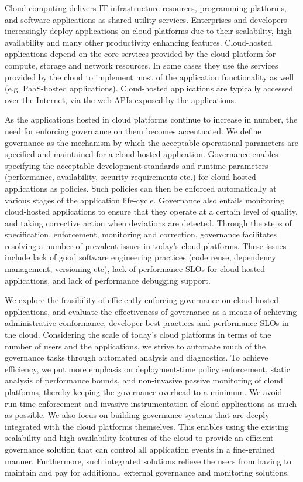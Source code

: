 Cloud computing delivers IT infrastructure resources, programming platforms, and software
applications as shared utility services. Enterprises and developers increasingly deploy applications 
on cloud platforms due to their scalability, high availability and many other
productivity enhancing features. Cloud-hosted applications depend on the core services provided
by the cloud platform for compute, storage and network resources. 
In some cases they use the services provided by the cloud to implement most of
the application functionality as well (e.g. PaaS-hosted applications). 
Cloud-hosted applications are typically
accessed over the Internet, via the web APIs exposed by the applications.

As the applications hosted in cloud platforms continue to increase in number, the need for enforcing
governance on them becomes accentuated. We define governance as the mechanism by which the 
acceptable operational parameters are specified and maintained for a cloud-hosted application.
Governance enables specifying the acceptable
development standards and runtime parameters (performance, availability, security requirements etc.) 
for cloud-hosted applications as policies. Such
policies can then be enforced automatically at various stages of the application life-cycle. 
Governance also entails
monitoring cloud-hosted applications to ensure that they operate at a certain level of quality,
and taking corrective action when deviations are detected. Through the steps of specification,
enforcement, monitoring and correction, governance facilitates resolving a number of prevalent issues in
today's cloud platforms. These issues include lack of good software engineering practices (code reuse,
dependency management, versioning etc), lack of performance SLOs for cloud-hosted applications,
and lack of performance debugging support. 

We explore the feasibility of efficiently enforcing governance on cloud-hosted
applications, and evaluate the effectiveness of governance as a means of achieving administrative
conformance, developer best practices and performance SLOs in the cloud. Considering the scale of
today's cloud platforms in terms of the number of users and the applications, 
we strive to automate much of the governance tasks through
automated analysis and diagnostics. To achieve efficiency, we put more emphasis on deployment-time
policy enforcement, static analysis of performance bounds, and non-invasive passive monitoring of 
cloud platforms, thereby keeping the governance overhead
to a minimum. We avoid run-time enforcement and invasive instrumentation of cloud applications 
as much as possible. We also focus on building governance systems that are deeply integrated with
the cloud platforms themselves. This enables using the existing scalability and high availability features of the cloud
to provide an efficient governance solution that can control all application events in a fine-grained
manner. Furthermore, such integrated solutions relieve the users from having to maintain and pay
for additional, external governance and monitoring solutions.


